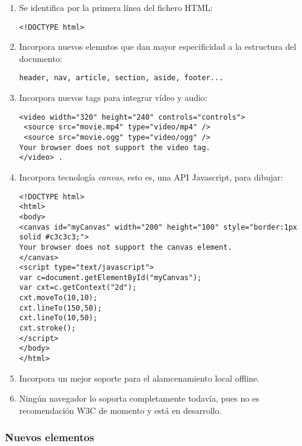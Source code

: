 \documentclass{apuntes}
\begin{document}
\begin{enumerate}
\item Se identifica por la primera línea del fichero HTML:
\begin{verbatim}
<!DOCTYPE html> 
\end{verbatim}
\item Incorpora nuevos elemntos que dan mayor especificidad a la estructura del documento:
\begin{verbatim}
header, nav, article, section, aside, footer...
\end{verbatim}
\item Incorpora nuevos tags para integrar vídeo y audio:
\begin{verbatim}
<video width="320" height="240" controls="controls"> 
 <source src="movie.mp4" type="video/mp4" /> 
 <source src="movie.ogg" type="video/ogg" /> 
Your browser does not support the video tag. 
</video> .
\end{verbatim}
\item Incorpora tecnología \emph{canvas}, esto es, una API Javascript, para dibujar:

\begin{verbatim}
<!DOCTYPE html> 
<html> 
<body> 
<canvas id="myCanvas" width="200" height="100" style="border:1px solid #c3c3c3;"> 
Your browser does not support the canvas element. 
</canvas> 
<script type="text/javascript"> 
var c=document.getElementById("myCanvas"); 
var cxt=c.getContext("2d"); 
cxt.moveTo(10,10); 
cxt.lineTo(150,50); 
cxt.lineTo(10,50); 
cxt.stroke(); 
</script> 
</body> 
</html> 
\end{verbatim}
\item Incorpora un mejor soporte para el alamcenamiento local offline.
\item Ningún navegador lo soporta completamente todavía, pues no es recomendación W3C de momento y está en desarrollo.
\end{enumerate}
\subsubsection{Nuevos elementos}
\end{document}
